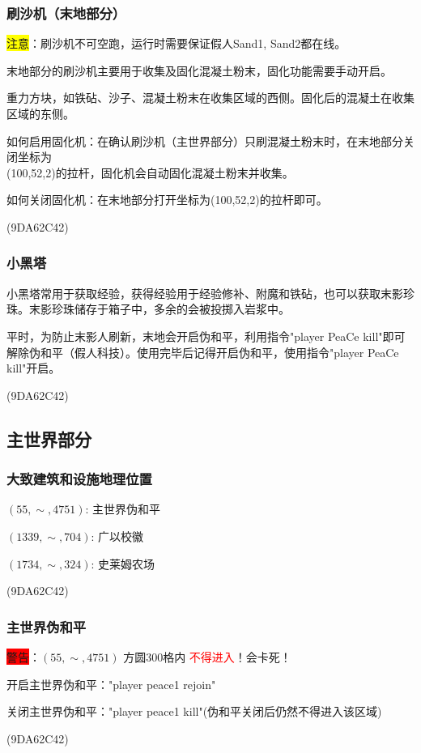 \documentclass[UTF8,a4paper]{article}
\begin{document}
			\subsubsection{刷沙机（末地部分）}
				\par \colorbox{yellow}{注意}：刷沙机不可空跑，运行时需要保证假人Sand1, Sand2都在线。
				\par 末地部分的刷沙机主要用于收集及固化混凝土粉末，固化功能需要手动开启。
				\par 重力方块，如铁砧、沙子、混凝土粉末在收集区域的西侧。固化后的混凝土在收集区域的东侧。
				\par 如何启用固化机：在确认刷沙机（主世界部分）只刷混凝土粉末时，在末地部分关闭坐标为 \\ (100,52,2)的拉杆，固化机会自动固化混凝土粉末并收集。
				\par 如何关闭固化机：在末地部分打开坐标为(100,52,2)的拉杆即可。
				\begin{flushright}(9DA62C42)\end{flushright}
			\subsubsection{小黑塔}
				\par 小黑塔常用于获取经验，获得经验用于经验修补、附魔和铁砧，也可以获取末影珍珠。末影珍珠储存于箱子中，多余的会被投掷入岩浆中。
				\par 平时，为防止末影人刷新，末地会开启伪和平，利用指令"player PeaCe kill"即可解除伪和平（假人科技）。使用完毕后记得开启伪和平，使用指令"player PeaCe kill"开启。
				\begin{flushright}(9DA62C42)\end{flushright}
		\subsection{主世界部分}
			\subsubsection{大致建筑和设施地理位置}
				\par $(55,\sim,4751)$: 主世界伪和平
				\par $(1339,\sim,704)$: 广以校徽
				\par $(1734,\sim,324)$: 史莱姆农场
				\begin{flushright}(9DA62C42)\end{flushright}
			\subsubsection{主世界伪和平}
				\par \colorbox{red}{警告}：$(55,\sim,4751)$ 方圆300格内 \textcolor{red}{不得进入}！会卡死！
				\par 开启主世界伪和平："player peace1 rejoin"
				\par 关闭主世界伪和平："player peace1 kill"(伪和平关闭后仍然不得进入该区域)
				\begin{flushright}(9DA62C42)\end{flushright}
\end{document}
